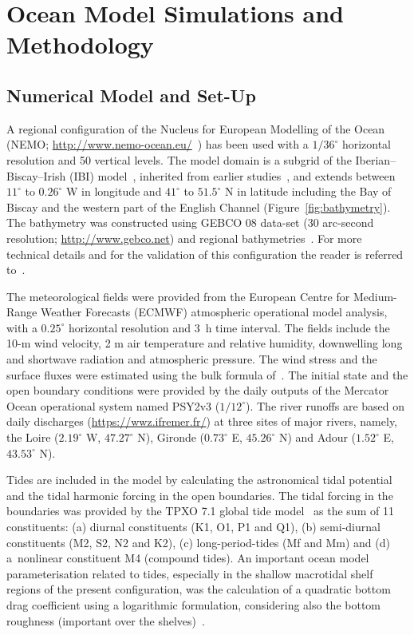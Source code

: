 \documentclass[jmse,article,accept,moreauthors,pdftex]{Definitions/mdpi}
\begin{document}
\section{Ocean Model Simulations and Methodology}
\label{section:2}
\vspace{-6pt}
\subsection{Numerical Model and Set-Up}
\label{section:2.1}

A regional configuration of the Nucleus for European Modelling of the Ocean (NEMO; \url{http://www.nemo-ocean.eu/}~\cite{Madec2012}) has been used with a $1/36 ^\circ$ horizontal resolution and 50 vertical levels. The model domain is a subgrid of the Iberian--Biscay--Irish (IBI) model~\cite{maraldi2013,Sotillo2015}, inherited from earlier studies~\cite{Quattrocchi2014,Vervatis2016}, and extends between $11^\circ$ to %
$0.26^\circ$ W in longitude and $41^\circ$ to $51.5^\circ$ N in latitude including the Bay of Biscay and the western part of the English Channel (Figure~\ref{fig:bathymetry}). The bathymetry was constructed using GEBCO 08 data-set (30 arc-second resolution; \url{http://www.gebco.net}) and regional bathymetries~\cite{maraldi2013}. For more technical details and for the validation of this configuration the reader is referred to~\cite{maraldi2013}.

The meteorological fields were provided from the European Centre for Medium-Range Weather Forecasts (ECMWF) atmospheric operational model analysis, with a $0.25^\circ$ horizontal resolution and 3~h time interval. The fields include the 10-m wind velocity, 2 m air temperature and relative humidity, downwelling long and shortwave radiation and atmospheric pressure. The wind stress and the surface fluxes were estimated using the bulk formula of~\cite{Large2004}. The initial state and the open boundary conditions were provided by the daily outputs of the Mercator Ocean operational system named PSY2v3 ($1/12^\circ$). The river runoffs are based on daily discharges (\url{https://wwz.ifremer.fr/}) at three sites of major rivers, namely, the  Loire ($2.19^\circ$ W, $47.27^\circ$ N), Gironde ($0.73^\circ$ E, $45.26^\circ$ N) and Adour ($1.52^\circ$ E, $43.53^\circ$ N). 

Tides are included in the model by calculating the astronomical tidal potential and the tidal harmonic forcing in the open boundaries. The tidal forcing in the boundaries was provided by the TPXO 7.1 global tide model~\cite{Egbert1994} as the sum of 11 constituents: (a) diurnal constituents (K1, O1, P1 and Q1), (b) semi-diurnal constituents (M2, S2, N2 and K2), (c) long-period-tides (Mf and Mm) and (d) a~nonlinear constituent M4 (compound tides). An important ocean model parameterisation related to tides, especially in the shallow macrotidal shelf regions of the present configuration, was the calculation of a quadratic bottom drag coefficient using a logarithmic formulation, considering also the bottom roughness (important over the shelves)~\cite{maraldi2013}. 
\end{document}
